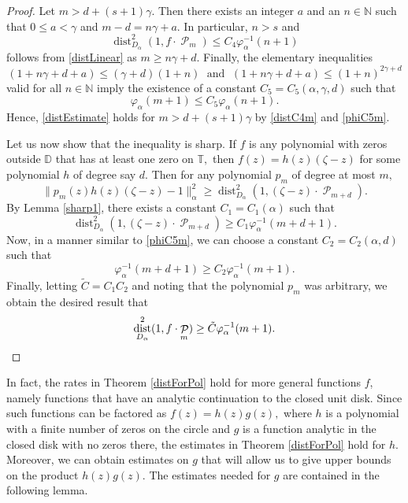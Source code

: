 \documentclass[11 pt,reqno]{amsart}
\theoremstyle{definition}
\theoremstyle{remark}
\numberwithin{equation}{section} \numberwithin{figure}{section}
\newcommand{\DD}{{\mathbb D}}
\newcommand{\TT}{{\mathbb T}}
\newcommand{\NN}{{\mathbb N}}
\DeclareMathOperator{\Pol}{{\mathcal P}}
\DeclareMathOperator{\dist}{dist}
\begin{document}
\begin{proof}
Let $m>d+(s+1)\gamma$.  Then there exists an integer $a$ and an $n\in\NN$
such that $0\leq a<\gamma$ and $m-d=n\gamma+a$.  In particular, $n>s$ and
\begin{equation}\label{distC4m}
            \dist_{D_{\alpha}}^{2}(1,f\cdot\Pol_{m})
            \leq C_{4}\varphi_{\alpha}^{-1}(n+1)
\end{equation}
follows from \eqref{distLinear} as $m\geq n\gamma+d$.  Finally, the elementary
inequalities
\[  (1+n\gamma+d+a)\leq(\gamma+d)(1+n)\;\text{ and }\;
        (1+n\gamma+d+a)\leq(1+n)^{2\gamma+d}    \]
valid for all $n\in\NN$ imply the existence of a constant $C_{5}=C_{5}(\alpha,\gamma,d)$
such that
\begin{equation}\label{phiC5m}
            \varphi_{\alpha}(m+1)\leq C_{5}\varphi_{\alpha}(n+1).
\end{equation}
Hence, \eqref{distEstimate} holds for $m>d+(s+1)\gamma$ by \eqref{distC4m}
and \eqref{phiC5m}.

Let us now show that the inequality is sharp.  If $f$ is any polynomial with zeros
outside $\DD$ that has at least one zero on $\TT,$ then $f(z) =  h(z)(\zeta - z)$
for some polynomial $h$ of degree say $d.$ Then for any polynomial $p_m$ of degree at most $m,$
$$ \| p_m(z) h(z) (\zeta - z) - 1 \|_{\alpha}^2 \geq \dist_{D_{\alpha}}^{2}(1,(\zeta - z) \cdot\Pol_{m+d}).$$ By Lemma \ref{sharp1}, there exists a constant
$C_1 = C_1(\alpha)$ such that
$$ \dist_{D_{\alpha}}^{2}(1,(\zeta - z) \cdot\Pol_{m+d}) \geq C_1 \varphi^{-1}_{\alpha}(m+d+1).$$ Now, in a manner similar to \eqref{phiC5m}, we can choose
a constant $C_2 = C_2(\alpha, d)$ such that
$$\varphi_{\alpha}^{-1}(m+d+1) \geq  C_2 \varphi_{\alpha}^{-1}(m+1).$$ Finally, letting $\tilde{C} = C_1 C_2$ and noting that the polynomial $p_m$ was arbitrary, we obtain
the desired result that
\begin{equation*}
            \dist_{D_{\alpha}}^{2}(1,f\cdot\Pol_{m}) \geq \tilde{C} \varphi_{\alpha}^{-1}(m+1).\qedhere
\end{equation*}
\end{proof}

In fact, the rates in Theorem \ref{distForPol} hold for more general functions $f$,
namely functions that have an analytic continuation to the closed unit disk.  Since
such functions can be factored as $f(z) = h(z) g(z),$ where $h$ is a polynomial with
a finite number of zeros on the circle and $g$ is a function analytic in the closed
disk with no zeros there, the estimates in Theorem \ref{distForPol} hold for $h$.
Moreover, we can obtain estimates on $g$ that will allow us to give upper bounds on
the product $h(z) g(z)$.  The estimates needed for $g$ are contained in the following lemma.
\end{document}
